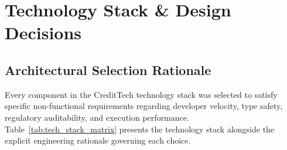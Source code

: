 \chapter{Technology Stack \& Design Decisions}
\label{chap:technology_stack}

\section{Architectural Selection Rationale}
Every component in the CreditTech technology stack was selected to satisfy specific non-functional requirements regarding developer velocity, type safety, regulatory auditability, and execution performance. Table~\ref{tab:tech_stack_matrix} presents the technology stack alongside the explicit engineering rationale governing each choice.

